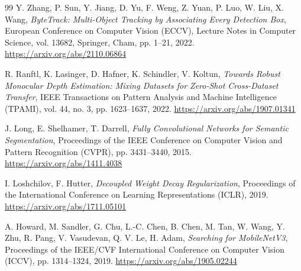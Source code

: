 \documentclass[12pt,a4paper]{report}
\begin{document}
\begin{thebibliography}{99}
Y. Zhang, P. Sun, Y. Jiang, D. Yu, F. Weng, Z. Yuan, P. Luo, W. Liu, X. Wang,
\textit{ByteTrack: Multi-Object Tracking by Associating Every Detection Box},
European Conference on Computer Vision (ECCV),
Lecture Notes in Computer Science, vol. 13682,
Springer, Cham, pp. 1--21, 2022.
\url{https://arxiv.org/abs/2110.06864}

R. Ranftl, K. Lasinger, D. Hafner, K. Schindler, V. Koltun,
\textit{Towards Robust Monocular Depth Estimation: Mixing Datasets for Zero-Shot Cross-Dataset Transfer},
IEEE Transactions on Pattern Analysis and Machine Intelligence (TPAMI),
vol. 44, no. 3, pp. 1623--1637, 2022.
\url{https://arxiv.org/abs/1907.01341}

J. Long, E. Shelhamer, T. Darrell,
\textit{Fully Convolutional Networks for Semantic Segmentation},
Proceedings of the IEEE Conference on Computer Vision and Pattern Recognition (CVPR),
pp. 3431--3440, 2015.
\url{https://arxiv.org/abs/1411.4038}

I. Loshchilov, F. Hutter,
\textit{Decoupled Weight Decay Regularization},
Proceedings of the International Conference on Learning Representations (ICLR),
2019.
\url{https://arxiv.org/abs/1711.05101}

A. Howard, M. Sandler, G. Chu, L.-C. Chen, B. Chen, M. Tan, W. Wang, Y. Zhu, R. Pang, V. Vasudevan, Q. V. Le, H. Adam,
\textit{Searching for MobileNetV3},
Proceedings of the IEEE/CVF International Conference on Computer Vision (ICCV),
pp. 1314--1324, 2019.
\url{https://arxiv.org/abs/1905.02244}

\end{thebibliography}
\end{document}
